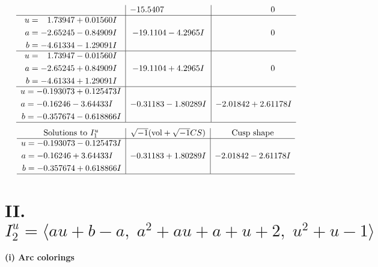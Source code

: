 \documentclass[1p]{elsarticle_modified}
\theoremstyle{definition}
\newcommand{\I}{\sqrt{-1}}
\begin{document}
$$\begin{array}{c|c|c}
 & -15.5407\phantom{ +0.000000I} & \phantom{-0.000000 } 0 \\ \hline\begin{aligned}
u &= \phantom{-}1.73947 + 0.01560 I \\
a &= -2.65245 - 0.84909 I \\
b &= -4.61334 - 1.29091 I\end{aligned}
 & -19.1104 - 4.2965 I & \phantom{-0.000000 } 0 \\ \hline\begin{aligned}
u &= \phantom{-}1.73947 - 0.01560 I \\
a &= -2.65245 + 0.84909 I \\
b &= -4.61334 + 1.29091 I\end{aligned}
 & -19.1104 + 4.2965 I & \phantom{-0.000000 } 0 \\ \hline\begin{aligned}
u &= -0.193073 + 0.125473 I \\
a &= -0.16246 - 3.64433 I \\
b &= -0.357674 - 0.618866 I\end{aligned}
 & -0.31183 - 1.80289 I & -2.01842 + 2.61178 I\\
 \hline 
 \end{array}$$\newpage$$\begin{array}{c|c|c}  
\text{Solutions to }I^u_{1}& \I (\text{vol} + \sqrt{-1}CS) & \text{Cusp shape}\\
 \hline 
\begin{aligned}
u &= -0.193073 - 0.125473 I \\
a &= -0.16246 + 3.64433 I \\
b &= -0.357674 + 0.618866 I\end{aligned}
 & -0.31183 + 1.80289 I & -2.01842 - 2.61178 I\\
 \hline 
 \end{array}$$\newpage\newpage\renewcommand{\arraystretch}{1}
\centering \section*{II. $I^u_{2}= \langle a u+b- a,\;a^2+a u+a+u+2,\;u^2+u-1 \rangle$}
\flushleft \textbf{(i) Arc colorings}\\
\end{document}
